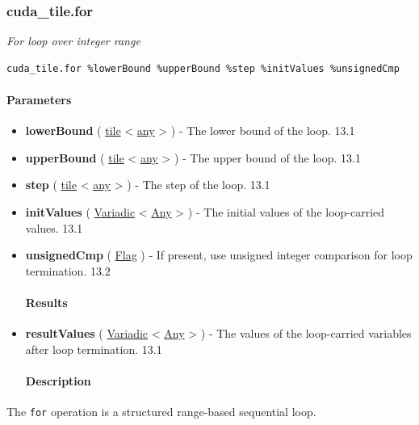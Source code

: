 \documentclass{article}
\begin{document}
\subsubsection{cuda\_tile.for}

\textit{For loop over integer range}


\begin{lstlisting}
cuda_tile.for %lowerBound %upperBound %step %initValues %unsignedCmp
\end{lstlisting}

\paragraph{Parameters}

\begin{itemize}
\item \textbf{lowerBound} ( \href{https://docs.nvidia.com/cuda/tile-ir/latest/sections/types.html#type-tile}{tile} < \href{https://docs.nvidia.com/cuda/tile-ir/latest/sections/operations.html#type-any}{any} > ) - The lower bound of the loop. 13.1
\item \textbf{upperBound} ( \href{https://docs.nvidia.com/cuda/tile-ir/latest/sections/types.html#type-tile}{tile} < \href{https://docs.nvidia.com/cuda/tile-ir/latest/sections/operations.html#type-any}{any} > ) - The upper bound of the loop. 13.1
\item \textbf{step} ( \href{https://docs.nvidia.com/cuda/tile-ir/latest/sections/types.html#type-tile}{tile} < \href{https://docs.nvidia.com/cuda/tile-ir/latest/sections/operations.html#type-any}{any} > ) - The step of the loop. 13.1
\item \textbf{initValues} ( \href{https://docs.nvidia.com/cuda/tile-ir/latest/sections/operations.html#type-variadic}{Variadic} < \href{https://docs.nvidia.com/cuda/tile-ir/latest/sections/operations.html#type-any}{Any} > ) - The initial values of the loop-carried values. 13.1
\item \textbf{unsignedCmp} ( \href{https://docs.nvidia.com/cuda/tile-ir/latest/sections/operations.html#type-flag}{Flag} ) - If present, use unsigned integer comparison for loop termination. 13.2


\paragraph{Results}

\item \textbf{resultValues} ( \href{https://docs.nvidia.com/cuda/tile-ir/latest/sections/operations.html#type-variadic}{Variadic} < \href{https://docs.nvidia.com/cuda/tile-ir/latest/sections/operations.html#type-any}{Any} > ) - The values of the loop-carried variables after loop termination. 13.1


\paragraph{Description}

\end{itemize}
The \texttt{for} operation is a structured range-based sequential loop.
\end{document}
